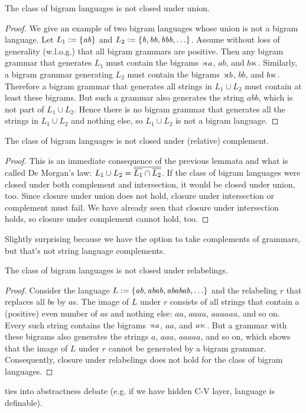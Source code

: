 \begin{lemma}
    The class of bigram languages is not closed under union. 
\end{lemma}
%
\begin{proof}
    We give an example of two bigram languages whose union is not a bigram language.
    Let $L_1 \mathrel{\mathop:}= \left \{ \mathit{ab} \right \}$ and $L_2 \mathrel{\mathop:}= \left \{ \mathit{b}, \mathit{bb}, \mathit{bbb}, \ldots \right \}$.
    Assume without loss of generality (w.l.o.g.) that all bigram grammars are positive.
    Then any bigram grammar that generates $L_1$ must contain the bigrams $\rtimes a$, $\mathit{ab}$, and $b \ltimes$.
    Similarly, a bigram grammar generating $L_2$ must contain the bigrams $\rtimes b$, $\mathit{bb}$, and $b \ltimes$.
    Therefore a bigram grammar that generates all strings in $L_1 \cup L_2$ must contain at least these bigrams.
    But such a grammar also generates the string $\mathit{abb}$, which is not part of $L_1 \cup L_2$.
    Hence there is no bigram grammar that generates all the strings in $L_1 \cup L_2$ and nothing else, so $L_1 \cup L_2$ is not a bigram language.
\end{proof}
%

\begin{lemma}
    The class of bigram languages is not closed under (relative) complement.
\end{lemma}
%
\begin{proof}
    This is an immediate consequence of the previous lemmata and what is called De Morgan's law: $L_1 \cup L_2 =  \overline{ \overline{L_1}  \cap  \overline{L_2} } $.
    If the class of bigram languages were closed under both complement and intersection, it would be closed under union, too.
    Since closure under union does not hold, closure under intersection or complement must fail.
    We have already seen that closure under intersection holds, so closure under complement cannot hold, too.
\end{proof}
%
Slightly surprising because we have the option to take complements of grammars, but that's not string language complements.

\begin{lemma}
    The class of bigram languages is not closed under relabelings.
\end{lemma}
%
\begin{proof}
    Consider the language $L \mathrel{\mathop:}= \left \{ \mathit{ab}, \mathit{abab}, \mathit{ababab}, \ldots \right \}$ and the relabeling $r$ that replaces all $b$s by $a$s.
    The image of $L$ under $r$ consists of all strings that contain a (positive) even number of $a$s and nothing else: $\mathit{aa}$, $\mathit{aaaa}$, $\mathit{aaaaaa}$, and so on.
    Every such string contains the bigrams $\rtimes a$, $\mathit{aa}$, and $a \ltimes$.
    But a grammar with these bigrams also generates the strings $a$, $\mathit{aaa}$, $\mathit{aaaaa}$, and so on, which shows that the image of $L$ under $r$ cannot be generated by a bigram grammar.
    Consequently, closure under relabelings does not hold for the class of bigram languages.
\end{proof}
%
ties into abstractness debate (e.g. if we have hidden C-V layer, language is definable).


